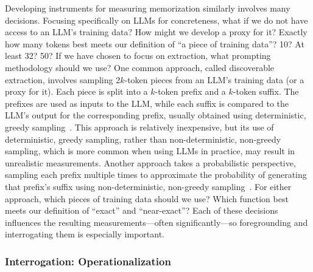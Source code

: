 \documentclass{article}
\begin{document}
Developing instruments for measuring memorization similarly involves many decisions. Focusing specifically on LLMs for concreteness, what if we do not have access to an LLM's training data? How might we develop a proxy for it? Exactly how many tokens best meets our definition of ``a piece of training data''? 10? At least 32? 50? If we have chosen to focus on extraction, what prompting methodology should we use? One common approach, called discoverable extraction, involves sampling 2$k$-token pieces from an LLM's training data (or a proxy for it). Each piece is split into a $k$-token prefix and a $k$-token suffix. The prefixes are used as inputs to the LLM, while each suffix is compared to the LLM's output for the corresponding prefix, usually obtained using deterministic, greedy sampling~\citep{carlini2021extracting, carlini2023quantifying, nasr2023scalable}. This approach is relatively inexpensive, but its use of deterministic, greedy sampling, rather than non-deterministic, non-greedy sampling, which is more common when using LLMs in practice, may result in unrealistic measurements. Another approach takes a probabilistic perspective, sampling each prefix multiple times to approximate the probability of generating that prefix's suffix using non-deterministic, non-greedy sampling~\cite{hayes2025measuring}. For either approach, which pieces of training data should we use? Which function best meets our definition of ``exact'' and ``near-exact''? Each of these decisions influences the resulting measurements---often significantly---so foregrounding and interrogating them is especially important.

\subsubsection{Interrogation: Operationalization}
\end{document}
